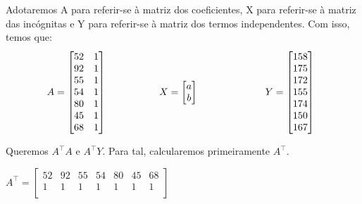 \documentclass{article}
\begin{document}
    Adotaremos A para referir-se à matriz dos coeficientes, X para referir-se à matriz das incógnitas e Y para referir-se à matriz dos termos independentes.
    Com isso, temos que:
    \newline
    \begin{align*}
        \begin{minipage}{.3\textwidth}
            \[ A = \begin{bmatrix}
            52 & 1 \\
            92 & 1 \\
            55 & 1 \\
            54 & 1 \\
            80 & 1 \\
            45 & 1 \\
            68 & 1 \\
            \end{bmatrix} \]
        \end{minipage}
        &
            \begin{minipage}{.3\textwidth}
            \[ X = \begin{bmatrix}
                a \\
                b \\
            \end{bmatrix} \]
        \end{minipage}
        &
        \begin{minipage}{.3\textwidth}
            \[ Y = \begin{bmatrix}
                158 \\
                175 \\
                172 \\
                155 \\
                174 \\
                150 \\
                167 \\
            \end{bmatrix} \]
        \end{minipage}
    \end{align*}
    \newpage
    
    Queremos $A^\top A$ e $A^\top Y$. Para tal, calcularemos primeiramente $A^\top$.
    \begin{center}
        $A^\top = 
        \begin{bmatrix}
            52 & 92 & 55 & 54 & 80 & 45 & 68 \\
            1 & 1 & 1 & 1 & 1 & 1 & 1 \\
        \end{bmatrix}$
    \end{center}
    
\end{document}
